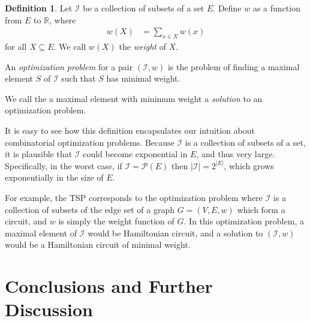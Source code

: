 \documentclass[a4paper,11pt]{report}
\theoremstyle{plain}
\theoremstyle{definition}
\newtheorem{defn}[defn]{Definition}
\newcommand{\I}{\mathcal{I}}
\begin{document}
\begin{defn}
Let $\I$ be a collection of subsets of a set $E$. Define $w$ as a function from
$E$ to $\mathbb{R}$, where
\begin{align*}
w(X) &= \sum_{x \in X}{w(x)}
\end{align*}
for all $X \subseteq E$. We call $w(X)$ the \emph{weight} of $X$.

An \emph{optimization problem} for a pair $(\I,w)$ is the problem of finding a
maximal element $S$ of $\I$ such that $S$ has minimal weight.
\end{defn}

We call the a maximal element with minimum weight a \emph{solution} to an
optimization problem.

It is easy to see how this definition encapsulates our intuition about
combinatorial optimization problems. Because $\I$ is a collection of subsets of
a set, it is plausible that $\I$ could become exponential in $E$, and thus very
large. Specifically, in the worst case, if $\I = \mathcal{P}(E)$ then
$|\I| = 2^{|E|}$, which grows exponentially in the size of $E$.

For example, the TSP corresponds to the optimization problem where $\I$ is a
collection of subsets of the edge set of a graph $G = (V,E,w)$ which form a
circuit, and $w$ is simply the weight function of $G$. In this optimization
problem, a maximal element of $\I$ would be Hamiltonian circuit, and a solution
to $(\I,w)$ would be a Hamiltonian circuit of minimal weight.




\section{Conclusions and Further Discussion}

\clearpage


\end{document}
